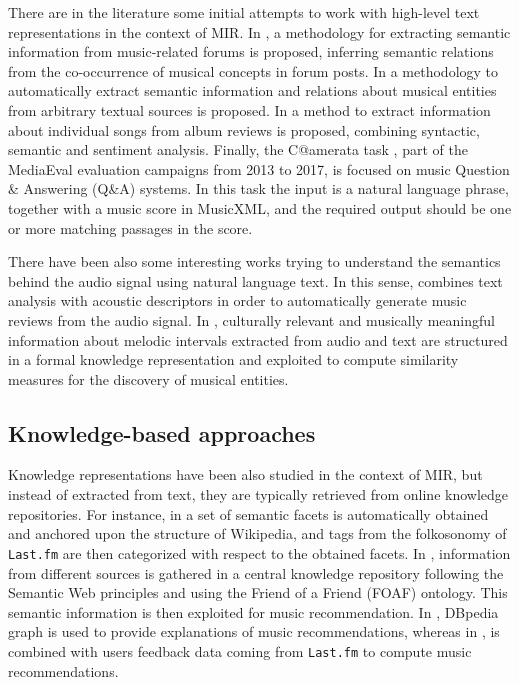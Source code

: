 There are in the literature some initial attempts to work with high-level text representations in the context of MIR. In \cite{Sordo2012}, a methodology for extracting semantic information from music-related forums is proposed, inferring semantic relations from the co-occurrence of musical concepts in forum posts. 
In \cite{Knees2011} a methodology to automatically extract semantic information and relations about musical entities from arbitrary textual sources is proposed. In \cite{Tata2010} a method to extract information about individual songs from album reviews is proposed, combining syntactic, semantic and sentiment analysis. Finally, the C@amerata task \citep{sutcliffe2016c, sutcliffe2015}, part of the MediaEval evaluation campaigns from 2013 to 2017, is focused on music Question \& Answering (Q\&A) systems. In this task the input is a natural language phrase, together with a music score in MusicXML, and the required output should be one or more matching passages in the score.

There have been also some interesting works trying to understand the semantics behind the audio signal using natural language text. In this sense, \cite{Whitman2004} combines text analysis with acoustic descriptors in order to automatically generate music reviews from the audio signal. In \cite{koduri2014culture}, culturally relevant and musically meaningful information about melodic intervals extracted from audio and text are structured in a formal knowledge representation and exploited to compute similarity measures for the discovery of musical entities.

\subsection{Knowledge-based approaches}
\label{sec:SOA:mir:semantics}

Knowledge representations have been also studied in the context of MIR, but instead of extracted from text, they are typically retrieved from online knowledge repositories. For instance, in \cite{sordo2013inferring} a set of semantic facets is automatically obtained and anchored upon the structure of Wikipedia, and tags from the folkosonomy of \texttt{Last.fm} are then categorized with respect to the obtained facets. In \cite{Celma:ISWC06}, information from different sources is gathered in a central knowledge repository following the Semantic Web principles and using the Friend of a Friend (FOAF) ontology. This semantic information is then exploited for music recommendation. In \cite{dbrec1}, DBpedia graph is used to provide explanations of music recommendations, whereas in \cite{Ostuni2013}, is combined with users feedback data coming from \texttt{Last.fm} to compute music recommendations.

